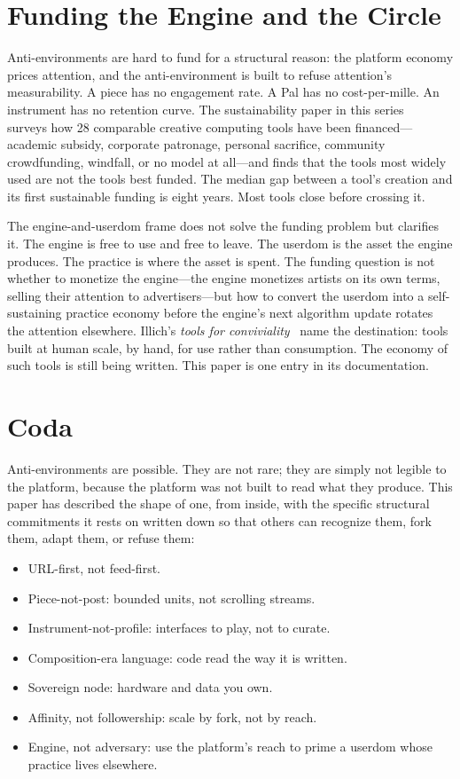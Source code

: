 \documentclass[10pt,letterpaper,twocolumn]{article}
\begin{document}
\section{Funding the Engine and the Circle}

Anti-environments are hard to fund for a structural reason: the platform economy prices attention, and the anti-environment is built to refuse attention's measurability. A piece has no engagement rate. A Pal has no cost-per-mille. An instrument has no retention curve. The sustainability paper in this series~\citep{scudder2026sustainability} surveys how 28 comparable creative computing tools have been financed---academic subsidy, corporate patronage, personal sacrifice, community crowdfunding, windfall, or no model at all---and finds that the tools most widely used are not the tools best funded. The median gap between a tool's creation and its first sustainable funding is eight years. Most tools close before crossing it.

The engine-and-userdom frame does not solve the funding problem but clarifies it. The engine is free to use and free to leave. The userdom is the asset the engine produces. The practice is where the asset is spent. The funding question is not whether to monetize the engine---the engine monetizes artists on its own terms, selling their attention to advertisers---but how to convert the userdom into a self-sustaining practice economy before the engine's next algorithm update rotates the attention elsewhere. Illich's \emph{tools for conviviality}~\citep{illich1973tools} name the destination: tools built at human scale, by hand, for use rather than consumption. The economy of such tools is still being written. This paper is one entry in its documentation.

\section{Coda}

Anti-environments are possible. They are not rare; they are simply not legible to the platform, because the platform was not built to read what they produce. This paper has described the shape of one, from inside, with the specific structural commitments it rests on written down so that others can recognize them, fork them, adapt them, or refuse them:

\begin{itemize}
  \item URL-first, not feed-first.
  \item Piece-not-post: bounded units, not scrolling streams.
  \item Instrument-not-profile: interfaces to play, not to curate.
  \item Composition-era language: code read the way it is written.
  \item Sovereign node: hardware and data you own.
  \item Affinity, not followership: scale by fork, not by reach.
  \item Engine, not adversary: use the platform's reach to prime a userdom whose practice lives elsewhere.
\end{itemize}
\end{document}

